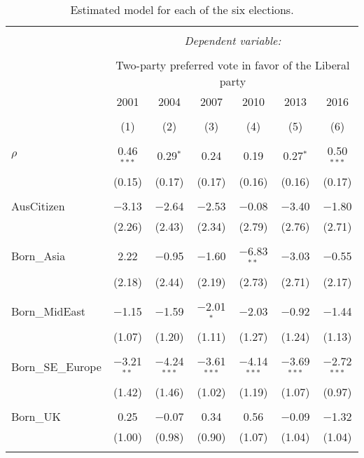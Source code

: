 \documentclass[openany]{book}
\begin{document}
\begin{table}[!htbp] \centering 
  \caption{Estimated model for each of the six elections.} 
  \label{} 
\scriptsize 
\begin{tabular}{@{\extracolsep{1pt}}lcccccc} 
\\[-1.8ex]\hline 
\hline \\[-1.8ex] 
 & \multicolumn{6}{c}{\textit{Dependent variable:}} \\ 
\cline{2-7} 
\\[-1.8ex] & \multicolumn{6}{c}{Two-party preferred vote in favor of the Liberal party} \\ 
 & 2001 & 2004 & 2007 & 2010 & 2013 & 2016 \\ 
\\[-1.8ex] & (1) & (2) & (3) & (4) & (5) & (6)\\ 
\hline \\[-1.8ex] 
 $\rho$ & 0.46$^{***}$ & 0.29$^{*}$ & 0.24 & 0.19 & 0.27$^{*}$ & 0.50$^{***}$ \\ 
  & (0.15) & (0.17) & (0.17) & (0.16) & (0.16) & (0.17) \\ 
  & & & & & & \\ 
 AusCitizen & $-$3.13 & $-$2.64 & $-$2.53 & $-$0.08 & $-$3.40 & $-$1.80 \\ 
  & (2.26) & (2.43) & (2.34) & (2.79) & (2.76) & (2.71) \\ 
  & & & & & & \\ 
 Born\_Asia & 2.22 & $-$0.95 & $-$1.60 & $-$6.83$^{**}$ & $-$3.03 & $-$0.55 \\ 
  & (2.18) & (2.44) & (2.19) & (2.73) & (2.71) & (2.17) \\ 
  & & & & & & \\ 
 Born\_MidEast & $-$1.15 & $-$1.59 & $-$2.01$^{*}$ & $-$2.03 & $-$0.92 & $-$1.44 \\ 
  & (1.07) & (1.20) & (1.11) & (1.27) & (1.24) & (1.13) \\ 
  & & & & & & \\ 
 Born\_SE\_Europe & $-$3.21$^{**}$ & $-$4.24$^{***}$ & $-$3.61$^{***}$ & $-$4.14$^{***}$ & $-$3.69$^{***}$ & $-$2.72$^{***}$ \\ 
  & (1.42) & (1.46) & (1.02) & (1.19) & (1.07) & (0.97) \\ 
  & & & & & & \\ 
 Born\_UK & 0.25 & $-$0.07 & 0.34 & 0.56 & $-$0.09 & $-$1.32 \\ 
  & (1.00) & (0.98) & (0.90) & (1.07) & (1.04) & (1.04) \\ 
  & & & & & & \\ 

\end{tabular}
\end{table}
\end{document}

